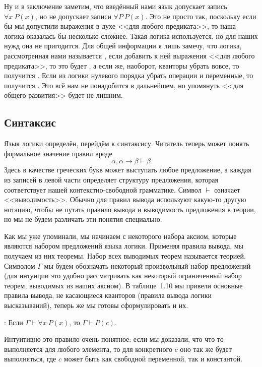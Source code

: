 Ну и в заключение заметим, что введённый нами язык допускает запись $\forall x\ P(x)$, но не допускает записи $\forall P\ P(x)$. Это не просто так, поскольку если бы мы допустили выражения в духе <<для любого предиката>>, то наша логика оказалась бы несколько сложнее. Такая логика используется, но для наших нужд она не пригодится. Для общей информации я лишь замечу, что логика, рассмотренная нами называется , если добавить к ней выражения <<для любого предиката>>, то это будет , а если же, наоборот, кванторы убрать вовсе, то получится . Если из логики нулевого порядка убрать операции и переменные, то получится . Это всё нам не понадобится в дальнейшем, но упомянуть <<для общего развития>> будет не лишним.

\subsection{Синтаксис}

Язык логики определён, перейдём к синтаксису. Читатель теперь может понять формальное значение правил вроде
$$\alpha, \alpha\to\beta \vdash \beta$$
Здесь в качестве греческих букв может выступать любое предложение, а каждая из записей в левой части определяет структуру предложения, которая соответствует нашей контекстно-свободной грамматике. Символ $\vdash$ означает <<выводимость>>. Обычно для правил вывода  используют какую-то другую нотацию, чтобы не путать правило вывода и выводимость предложения в теории, но мы не будем различать эти понятия специально.

Как мы уже упоминали, мы начинаем с некоторого набора аксиом, которые являются набором предложений языка логики. Применяя правила вывода, мы получаем из них теоремы. Набор всех выводимых теорем называется теорией. Символом $\Gamma$ мы будем обозначать некоторый произвольный набор предложений (для интуиции это удобно рассматривать как некоторый ограниченный набор теорем, выводимых из наших аксиом). В таблице~1.10 мы привели основные правила вывода, не касающиеся кванторов (правила вывода логики высказываний), теперь же мы готовы сформулировать и их.

: Если $\Gamma \vdash \forall x\ P(x)$, то $\Gamma \vdash P(c)$.

Интуитивно это правило очень понятное: если мы доказали, что что-то выполняется для любого элемента, то для конкретного $c$ оно так же будет выполняться, где $c$ может быть как свободной переменной, так и константой.

